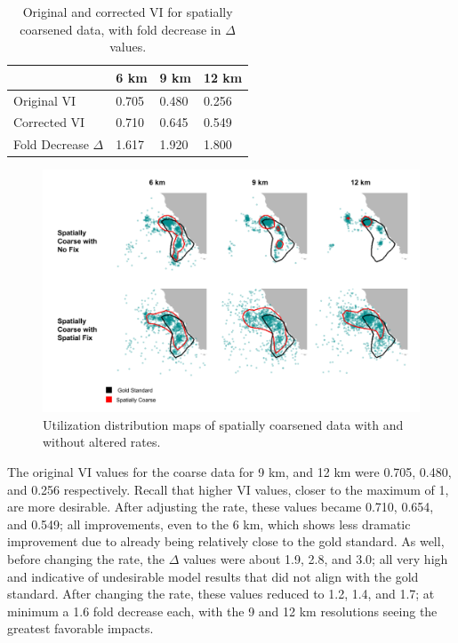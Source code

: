 \documentclass[11pt]{article}
\begin{document}
\begin{table}[ht]
    \centering
    \begin{tabular}{llll}
    \toprule
     &6 km&9 km &12 km\\\hline
    Original VI &0.705 &0.480 &0.256\\
    Corrected VI& 0.710& 0.645& 0.549\\
    Fold Decrease $\Delta$& 1.617& 1.920& 1.800\\
    \toprule
    \end{tabular}
    \caption{Original and corrected VI for spatially coarsened data, with fold decrease in $\Delta$ values.}
\end{table}

\begin{figure}[ht] \centering
    \includegraphics[width=6in]{spatial_fix.png}
    \caption{Utilization distribution maps of spatially coarsened data with and without altered rates.}
\end{figure}

The original VI values for the coarse data for 9 km, and 12 km were 0.705, 0.480, and 0.256 respectively. Recall that higher VI values, closer to the maximum of 1, are more desirable. After adjusting the rate, these values became 0.710, 0.654, and 0.549; all improvements, even to the 6 km, which shows less dramatic improvement due to already being relatively close to the gold standard. As well, before changing the rate, the $\Delta$ values were about 1.9, 2.8, and 3.0; all very high and indicative of undesirable model results that did not align with the gold standard. After changing the rate, these values reduced to 1.2, 1.4, and 1.7; at minimum a 1.6 fold decrease each, with the 9 and 12 km resolutions seeing the greatest favorable impacts. \par
\end{document}

